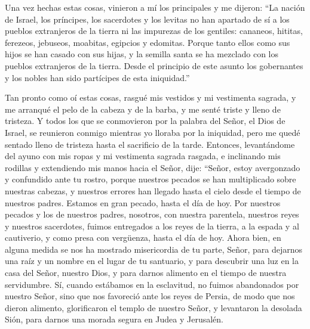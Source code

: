  Una vez hechas estas cosas, vinieron a mí los
principales y me dijeron:  ``La nación de Israel, los
príncipes, los sacerdotes y los levitas no han apartado de sí a los
pueblos extranjeros de la tierra ni las impurezas de los gentiles:
cananeos, hititas, ferezeos, jebuseos, moabitas, egipcios y edomitas.
 Porque tanto ellos como sus hijos se han casado con sus
hijas, y la semilla santa se ha mezclado con los pueblos extranjeros de
la tierra. Desde el principio de este asunto los gobernantes y los
nobles han sido partícipes de esta iniquidad.''

 Tan pronto como oí estas cosas, rasgué mis vestidos y mi
vestimenta sagrada, y me arranqué el pelo de la cabeza y de la barba, y
me senté triste y lleno de tristeza.  Y todos los que se
conmovieron por la palabra del Señor, el Dios de Israel, se reunieron
conmigo mientras yo lloraba por la iniquidad, pero me quedé sentado
lleno de tristeza hasta el sacrificio de la tarde. 
Entonces, levantándome del ayuno con mis ropas y mi vestimenta sagrada
rasgada, e inclinando mis rodillas y extendiendo mis manos hacia el
Señor,  dije: ``Señor, estoy avergonzado y confundido
ante tu rostro,  porque nuestros pecados se han
multiplicado sobre nuestras cabezas, y nuestros errores han llegado
hasta el cielo  desde el tiempo de nuestros padres.
Estamos en gran pecado, hasta el día de hoy.  Por
nuestros pecados y los de nuestros padres, nosotros, con nuestra
parentela, nuestros reyes y nuestros sacerdotes, fuimos entregados a los
reyes de la tierra, a la espada y al cautiverio, y como presa con
vergüenza, hasta el día de hoy.  Ahora bien, en alguna
medida se nos ha mostrado misericordia de tu parte, Señor, para dejarnos
una raíz y un nombre en el lugar de tu santuario,  y para
descubrir una luz en la casa del Señor, nuestro Dios, y para darnos
alimento en el tiempo de nuestra servidumbre.  Sí, cuando
estábamos en la esclavitud, no fuimos abandonados por nuestro Señor,
sino que nos favoreció ante los reyes de Persia, de modo que nos dieron
alimento,  glorificaron el templo de nuestro Señor, y
levantaron la desolada Sión, para darnos una morada segura en Judea y
Jerusalén.


